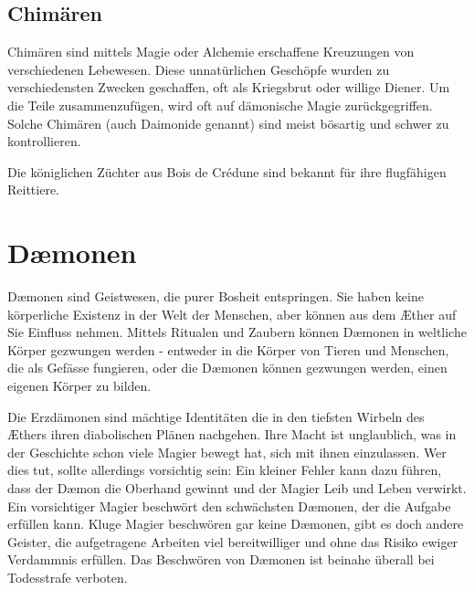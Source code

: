 \documentclass[12pt,twoside,twocolumn,openany]{book}
\begin{document}
\subsection{Chimären}


Chimären sind mittels Magie oder Alchemie erschaffene Kreuzungen von verschiedenen Lebewesen. Diese unnatürlichen Geschöpfe wurden zu verschiedensten Zwecken geschaffen, oft als Kriegsbrut oder willige Diener. Um die Teile zusammenzufügen, wird oft auf dämonische Magie zurückgegriffen. Solche Chimären (auch Daimonide genannt) sind meist bösartig und schwer zu kontrollieren.

Die königlichen Züchter aus Bois de Crédune sind bekannt für ihre flugfähigen Reittiere.





\section{D\ae monen}
D\ae monen sind Geistwesen, die purer Bosheit entspringen. Sie haben keine körperliche Existenz in der Welt der Menschen, aber können aus dem \AE ther auf Sie Einfluss nehmen. Mittels Ritualen und Zaubern können D\ae monen in weltliche Körper gezwungen werden - entweder in die Körper von Tieren und Menschen, die als Gefässe fungieren, oder die D\ae monen können gezwungen werden, einen eigenen Körper zu bilden.

Die Erzdämonen sind mächtige Identitäten die in den tiefsten Wirbeln des \AE thers ihren diabolischen Plänen nachgehen. Ihre Macht ist unglaublich, was in der Geschichte schon viele Magier bewegt hat, sich mit ihnen einzulassen. Wer dies tut, sollte allerdings vorsichtig sein: Ein kleiner Fehler kann dazu führen, dass der D\ae mon die Oberhand gewinnt und der Magier Leib und Leben verwirkt. Ein vorsichtiger Magier beschwört den schwächsten D\ae monen, der die Aufgabe erfüllen kann. Kluge Magier beschwören gar keine D\ae monen, gibt es doch andere Geister, die aufgetragene Arbeiten viel bereitwilliger und ohne das Risiko ewiger Verdammnis erfüllen. Das Beschwören von D\ae monen ist beinahe überall bei Todesstrafe verboten.
\end{document}
